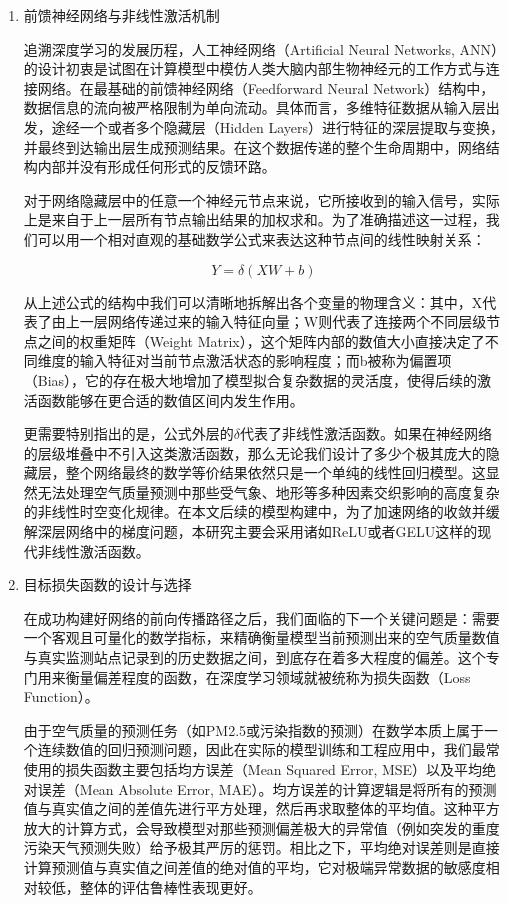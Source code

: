\begin{enumerate}[label=（\arabic*）, leftmargin=0pt, itemindent=4.5em, labelsep=0.5em, listparindent=2em, parsep=0pt]

    \item 前馈神经网络与非线性激活机制
    
    追溯深度学习的发展历程，人工神经网络（Artificial Neural Networks, ANN）的设计初衷是试图在计算模型中模仿人类大脑内部生物神经元的工作方式与连接网络。在最基础的前馈神经网络（Feedforward Neural Network）结构中，数据信息的流向被严格限制为单向流动。具体而言，多维特征数据从输入层出发，途经一个或者多个隐藏层（Hidden Layers）进行特征的深层提取与变换，并最终到达输出层生成预测结果。在这个数据传递的整个生命周期中，网络结构内部并没有形成任何形式的反馈环路。

    对于网络隐藏层中的任意一个神经元节点来说，它所接收到的输入信号，实际上是来自于上一层所有节点输出结果的加权求和。为了准确描述这一过程，我们可以用一个相对直观的基础数学公式来表达这种节点间的线性映射关系：

    \begin{equation}
        Y = \delta(XW+b)
    \end{equation}

    从上述公式的结构中我们可以清晰地拆解出各个变量的物理含义：其中，X代表了由上一层网络传递过来的输入特征向量；W则代表了连接两个不同层级节点之间的权重矩阵（Weight Matrix），这个矩阵内部的数值大小直接决定了不同维度的输入特征对当前节点激活状态的影响程度；而b被称为偏置项（Bias），它的存在极大地增加了模型拟合复杂数据的灵活度，使得后续的激活函数能够在更合适的数值区间内发生作用。

    更需要特别指出的是，公式外层的$\delta$代表了非线性激活函数。如果在神经网络的层级堆叠中不引入这类激活函数，那么无论我们设计了多少个极其庞大的隐藏层，整个网络最终的数学等价结果依然只是一个单纯的线性回归模型。这显然无法处理空气质量预测中那些受气象、地形等多种因素交织影响的高度复杂的非线性时空变化规律。在本文后续的模型构建中，为了加速网络的收敛并缓解深层网络中的梯度问题，本研究主要会采用诸如ReLU或者GELU这样的现代非线性激活函数。

    \item 目标损失函数的设计与选择
    
    在成功构建好网络的前向传播路径之后，我们面临的下一个关键问题是：需要一个客观且可量化的数学指标，来精确衡量模型当前预测出来的空气质量数值与真实监测站点记录到的历史数据之间，到底存在着多大程度的偏差。这个专门用来衡量偏差程度的函数，在深度学习领域就被统称为损失函数（Loss Function）。

    由于空气质量的预测任务（如PM2.5或污染指数的预测）在数学本质上属于一个连续数值的回归预测问题，因此在实际的模型训练和工程应用中，我们最常使用的损失函数主要包括均方误差（Mean Squared Error, MSE）以及平均绝对误差（Mean Absolute Error, MAE）。均方误差的计算逻辑是将所有的预测值与真实值之间的差值先进行平方处理，然后再求取整体的平均值。这种平方放大的计算方式，会导致模型对那些预测偏差极大的异常值（例如突发的重度污染天气预测失败）给予极其严厉的惩罚。相比之下，平均绝对误差则是直接计算预测值与真实值之间差值的绝对值的平均，它对极端异常数据的敏感度相对较低，整体的评估鲁棒性表现更好。


\end{enumerate}
